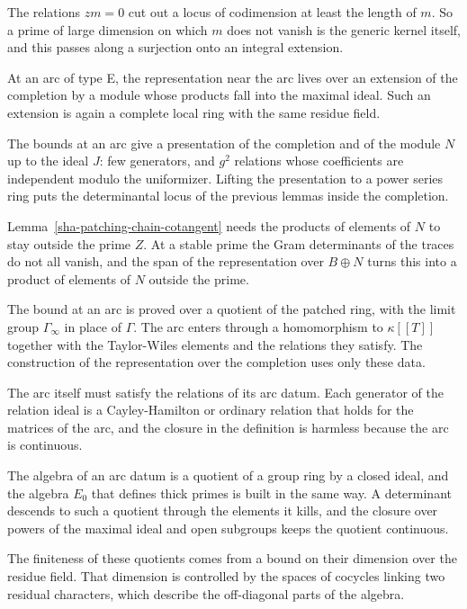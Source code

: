 The relations $zm=0$ cut out a locus of codimension at least the length of $m$. So a prime of large dimension on which $m$ does not vanish is the generic kernel itself, and this passes along a surjection onto an integral extension.

At an arc of type E, the representation near the arc lives over an extension of the completion by a module whose products fall into the maximal ideal. Such an extension is again a complete local ring with the same residue field.

The bounds at an arc give a presentation of the completion and of the module $N$ up to the ideal $J$: few generators, and $g^2$ relations whose coefficients are independent modulo the uniformizer. Lifting the presentation to a power series ring puts the determinantal locus of the previous lemmas inside the completion.

Lemma~\ref{sha-patching-chain-cotangent} needs the products of elements of $N$ to stay outside the prime $Z$. At a stable prime the Gram determinants of the traces do not all vanish, and the span of the representation over $B\oplus N$ turns this into a product of elements of $N$ outside the prime.

The bound at an arc is proved over a quotient of the patched ring, with the limit group $\Gamma_\infty$ in place of $\Gamma$. The arc enters through a homomorphism to $\kappa[[T]]$ together with the Taylor-Wiles elements and the relations they satisfy. The construction of the representation over the completion uses only these data.

The arc itself must satisfy the relations of its arc datum. Each generator of the relation ideal is a Cayley-Hamilton or ordinary relation that holds for the matrices of the arc, and the closure in the definition is harmless because the arc is continuous.

The algebra of an arc datum is a quotient of a group ring by a closed ideal, and the algebra $E_0$ that defines thick primes is built in the same way. A determinant descends to such a quotient through the elements it kills, and the closure over powers of the maximal ideal and open subgroups keeps the quotient continuous.

The finiteness of these quotients comes from a bound on their dimension over the residue field. That dimension is controlled by the spaces of cocycles linking two residual characters, which describe the off-diagonal parts of the algebra.

